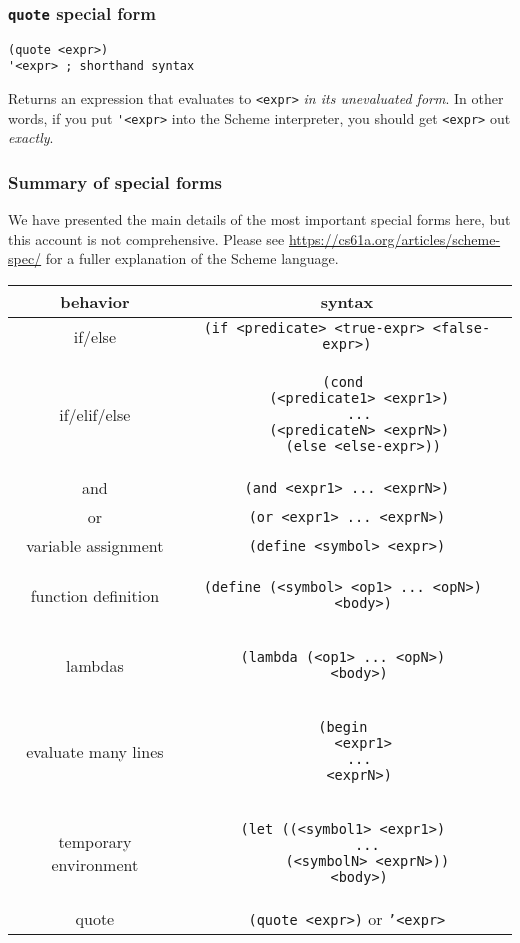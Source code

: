 \subsubsection{\lstinline{quote} special form}
\begin{lstlisting}
(quote <expr>)
'<expr> ; shorthand syntax
\end{lstlisting}
Returns an expression that evaluates to \lstinline{<expr>} \textit{in its unevaluated form}. In other words, if you put \lstinline{'<expr>} into the Scheme interpreter, you should get \lstinline{<expr>} out \textit{exactly}. 


\subsubsection{Summary of special forms}
We have presented the main details of the most important special forms here, but this account is not comprehensive. Please see \url{https://cs61a.org/articles/scheme-spec/} for a fuller explanation of the Scheme language. 
\vspace{0.2in}
\begin{center}
\begin{tabular}{ |c|c| }
    \hline
    behavior & syntax \\
    \hline
    if/else & \texttt{(if <predicate> <true-expr> <false-expr>)}  \\
    \hline
    if/elif/else  
& \begin{lstlisting}
(cond 
    (<predicate1> <expr1>) 
    ... 
    (<predicateN> <exprN>) 
    (else <else-expr>))
\end{lstlisting} \\
    \hline
    and & \texttt{(and <expr1> ... <exprN>)} \\
    \hline
    or & \texttt{(or <expr1> ... <exprN>)} \\
    \hline
    variable assignment   & \texttt{(define <symbol> <expr>)} \\
    \hline
    function definition & 
\begin{lstlisting}
(define (<symbol> <op1> ... <opN>) 
    <body>)
\end{lstlisting}  \\
    \hline
    lambdas & 
\begin{lstlisting} 
(lambda (<op1> ... <opN>) 
    <body>) 
\end{lstlisting} \\
\hline
    evaluate many lines & 
\begin{lstlisting}
(begin 
    <expr1>
    ... 
    <exprN>) 
\end{lstlisting} \\
    \hline
    temporary environment & 
\begin{lstlisting} 
(let ((<symbol1> <expr1>) 
      ... 
      (<symbolN> <exprN>)) 
    <body>) 
\end{lstlisting}\\
    \hline
    quote & \texttt{(quote <expr>)} or \texttt{'<expr>}  \\
    \hline
\end{tabular}
\end{center}